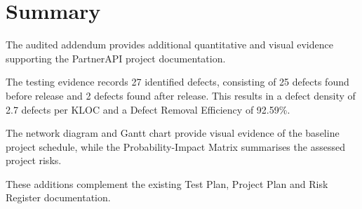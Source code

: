 \documentclass[12pt,a4paper]{article}
\begin{document}
\section{Summary}

The audited addendum provides additional quantitative and visual
evidence supporting the PartnerAPI project documentation.

The testing evidence records 27 identified defects, consisting of
25 defects found before release and 2 defects found after release.
This results in a defect density of 2.7 defects per KLOC and a
Defect Removal Efficiency of 92.59\%.

The network diagram and Gantt chart provide visual evidence of the
baseline project schedule, while the Probability-Impact Matrix
summarises the assessed project risks.

These additions complement the existing Test Plan, Project Plan and
Risk Register documentation.
\end{document}
